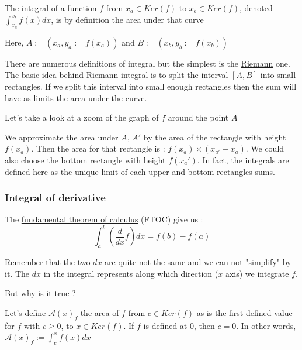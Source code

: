 \documentclass[12pt]{article}
\begin{document}
The integral of a function $f$ from $x_a \in Ker(f)$ to $x_b \in Ker(f)$, denoted $\int_{x_a}^{x_b} f(x)dx$, is by definition the area under that curve 

\begin{figure}[H]
 \centering
 
\end{figure}

Here, $A := (x_a, y_a:=f(x_a))$ and $B := (x_b, y_b:=f(x_b))$

There are numerous definitions of integral but the simplest is the \href{https://en.wikipedia.org/wiki/Riemann_integral}{Riemann} one. The basic idea behind Riemann integral is to split the interval $[A, B]$ into small rectangles. If we split this interval into small enough rectangles then the sum will have as limits the area under the curve.

Let's take a look at a zoom of the graph of $f$ around the point $A$


\begin{figure}[H]
 \centering
 
\end{figure}

We approximate the area under $A$, $A'$ by the area of the rectangle with height $f(x_a)$. Then the area for that rectangle is : $f(x_a) \times (x_{a'} - x_a)$. We could also choose the bottom rectangle with height $f(x_a')$. In fact, the integrals are defined here as the unique limit of each upper and bottom rectangles sums.

\subsubsection{Integral of derivative}

The \href{https://en.wikipedia.org/wiki/Fundamental_theorem_of_calculus}{fundamental theorem of calculus} (FTOC) give us : 
$$ \int_a^b (\frac{d}{dx}f)dx = f(b) - f(a) $$

Remember that the two $dx$ are quite not the same and we can not "simplify" by it. The $dx$ in the integral represents along which direction ($x$ axis) we integrate $f$.

But why is it true ?

Let's define $\mathcal{A}(x)_f$ the area of $f$ from $c \in Ker(f)$ as is the first defined value for $f$ with $c \geq 0$, to $x \in Ker(f)$. If $f$ is defined at $0$, then $c=0$. In other words, $\mathcal{A}(x)_f := \int_c^{x}f(x)dx$
\end{document}
